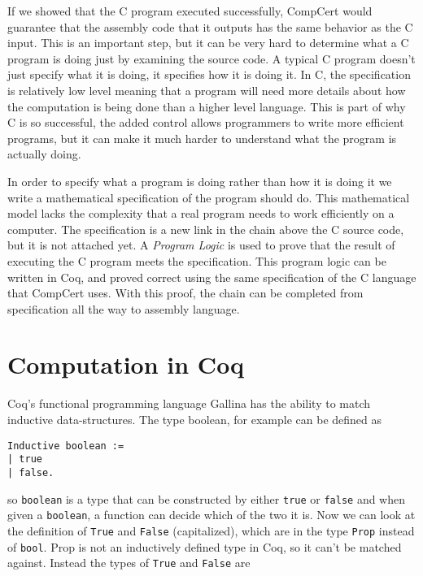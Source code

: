 \documentclass{puthesis}
\begin{document}
If we showed that the C program executed successfully, CompCert would
guarantee that the assembly code that it outputs has the same behavior
as the C input. This is an important step, but it can be very hard to 
determine what a C program is doing just by examining the source code.
A typical C program doesn't just specify what it is doing, it specifies
how it is doing it. In C, the specification is relatively low level
meaning that a program will need more details about how the computation
is being done than a higher level language. This is part of why C is 
so successful, the added control allows programmers to write more efficient
programs, but it can make it much harder to understand what the program
is actually doing.

In order to specify what a program is doing rather than how it is doing
it we write a mathematical specification of the program should do. This
mathematical model lacks the
complexity that a real program needs to work efficiently on a
computer. The specification is a new link in the chain above
the C source code, but it is not attached yet. A 
\emph{Program Logic} is used to prove that the result
of executing the C program meets the specification. This program logic
can be written in Coq, and proved correct using the same specification
of the C language that CompCert uses. With this proof, the chain
can be completed from specification all the way to assembly language.


\chapter{Computation in Coq}

Coq's functional programming language Gallina has the ability to match inductive
data-structures. The type boolean, for example can be defined as

\begin{lstlisting}
Inductive boolean :=
| true
| false.
\end{lstlisting}

so \lstinline|boolean| is a type that can be constructed by either \lstinline|true| or \lstinline|false|
and when given a \lstinline|boolean|, a function can decide which of the two it is. Now we can look 
at the definition of \lstinline|True| and \lstinline|False| (capitalized), which are in the type 
\lstinline|Prop| instead of \lstinline|bool|. Prop is not an
inductively defined type in Coq, so it can't be matched
against. Instead the types of \lstinline|True| and \lstinline|False|
are
\end{document}
